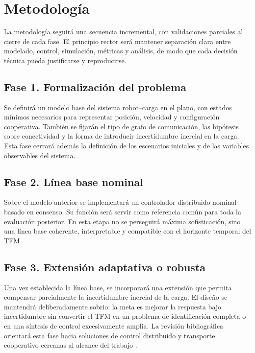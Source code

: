 \section{Metodología}

La metodología seguirá una secuencia incremental, con validaciones parciales al cierre de cada fase. El principio rector será mantener separación clara entre modelado, control, simulación, métricas y análisis, de modo que cada decisión técnica pueda justificarse y reproducirse.

\subsection{Fase 1. Formalización del problema}

Se definirá un modelo base del sistema robot--carga en el plano, con estados mínimos necesarios para representar posición, velocidad y configuración cooperativa. También se fijarán el tipo de grafo de comunicación, las hipótesis sobre conectividad y la forma de introducir incertidumbre inercial en la carga. Esta fase cerrará además la definición de los escenarios iniciales y de las variables observables del sistema.

\subsection{Fase 2. Línea base nominal}

Sobre el modelo anterior se implementará un controlador distribuido nominal basado en consenso. Su función será servir como referencia común para toda la evaluación posterior. En esta etapa no se perseguirá máxima sofisticación, sino una línea base coherente, interpretable y compatible con el horizonte temporal del TFM \citep{bullo2009distributed,olfati2004consensus,ren2008distributed}.

\subsection{Fase 3. Extensión adaptativa o robusta}

Una vez establecida la línea base, se incorporará una extensión que permita compensar parcialmente la incertidumbre inercial de la carga. El diseño se mantendrá deliberadamente sobrio: la meta es mejorar la respuesta bajo incertidumbre sin convertir el TFM en un problema de identificación completa o en una síntesis de control excesivamente amplia. La revisión bibliográfica orientará esta fase hacia soluciones de control distribuido y transporte cooperativo cercanas al alcance del trabajo \citep{quijano2017population,verginis2018communication,rosenfelder2024force}.

